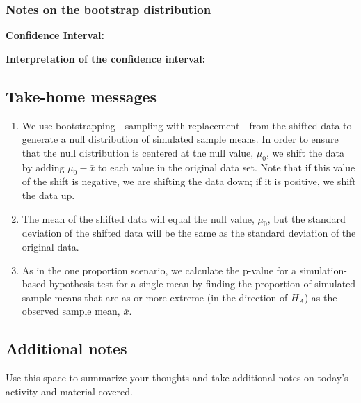 \documentclass[
]{report}
\begin{document}
\subsubsection*{Notes on the bootstrap distribution}\label{notes-on-the-bootstrap-distribution-1}

\vspace{2in}

\textbf{Confidence Interval:}

\vspace{1in}

\textbf{Interpretation of the confidence interval:}

\vspace{1in}

\newpage

\subsection{Take-home messages}\label{take-home-messages-9}

\begin{enumerate}
\def\labelenumi{\arabic{enumi}.}
\item
  We use bootstrapping---sampling with replacement---from the shifted data to generate a null distribution of simulated sample means. In order to ensure that the null distribution is centered at the null value, \(\mu_0\), we shift the data by adding \(\mu_0 - \bar{x}\) to each value in the original data set. Note that if this value of the shift is negative, we are shifting the data down; if it is positive, we shift the data up.
\item
  The mean of the shifted data will equal the null value, \(\mu_0\), but the standard deviation of the shifted data will be the same as the standard deviation of the original data.
\item
  As in the one proportion scenario, we calculate the p-value for a simulation-based hypothesis test for a single mean by finding the proportion of simulated sample means that are as or more extreme (in the direction of \(H_A\)) as the observed sample mean, \(\bar{x}\).
\end{enumerate}

\subsection{Additional notes}\label{additional-notes-9}

Use this space to summarize your thoughts and take additional notes on today's activity and material covered.
\end{document}
